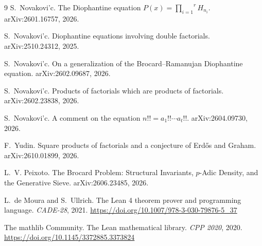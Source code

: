 \documentclass[11pt]{article}
\begin{document}
\begin{thebibliography}{9}
S.~Novakovi'c.
\newblock The Diophantine equation $P(x)=\overset{r}{\underset{i=1}{\prod}}H_{n_i}$.
\newblock arXiv:2601.16757, 2026.

S.~Novakovi'c.
\newblock Diophantine equations involving double factorials.
\newblock arXiv:2510.24312, 2025.

S.~Novakovi'c.
\newblock On a generalization of the Brocard--Ramanujan Diophantine equation.
\newblock arXiv:2602.09687, 2026.

S.~Novakovi'c.
\newblock Products of factorials which are products of factorials.
\newblock arXiv:2602.23838, 2026.

S.~Novakovi'c.
\newblock A comment on the equation $n!!=a_1!!\cdots a_t!!$.
\newblock arXiv:2604.09730, 2026.

F.~Yudin.
\newblock Square products of factorials and a conjecture of Erd\H{o}s and Graham.
\newblock arXiv:2610.01899, 2026.

L.~V. Peixoto.
\newblock The Brocard Problem: Structural Invariants, $p$-Adic Density, and the Generative Sieve.
\newblock arXiv:2606.23485, 2026.

L.~de Moura and S.~Ullrich.
\newblock The Lean 4 theorem prover and programming language.
\newblock \emph{CADE-28}, 2021. \url{https://doi.org/10.1007/978-3-030-79876-5_37}

The mathlib Community.
\newblock The Lean mathematical library.
\newblock \emph{CPP 2020}, 2020. \url{https://doi.org/10.1145/3372885.3373824}
\end{thebibliography}
\end{document}
